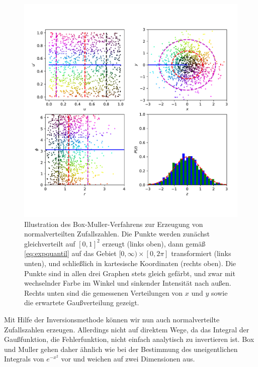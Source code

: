\begin{figure}
  \centering
  \includegraphics[width=\textwidth]{plots/inversion}
  \caption{Illustration des Box-Muller-Verfahrens zur Erzeugung von
    normalverteilten Zufallszahlen. Die Punkte werden zunächst
    gleichverteilt auf $[0,1]^2$ erzeugt (links oben), dann
    gemäß \eqref{eq:expquantil} auf das Gebiet
    $[0,\infty)\times[0,2\pi]$ transformiert (links unten), und
    schließlich in kartesische Koordinaten (rechts oben). Die Punkte
    sind in allen drei Graphen stets gleich gefärbt, und zwar mit
    wechselnder Farbe im Winkel und sinkender Intensität nach
    außen. Rechts unten sind die gemessenen Verteilungen von $x$ und
    $y$ sowie die erwartete Gaußverteilung gezeigt.}
  \label{fig:boxmuller}
\end{figure}

Mit Hilfe der Inversionsmethode können wir nun auch normalverteilte
Zufallszahlen erzeugen. Allerdings nicht auf direktem Wege, da das
Integral der Gaußfunktion, die Fehlerfunktion, nicht einfach
analytisch zu invertieren ist. Box und Muller gehen daher ähnlich wie
bei der Bestimmung des uneigentlichen Integrals von $e^{-x^2}$ vor
und weichen auf zwei Dimensionen aus.

